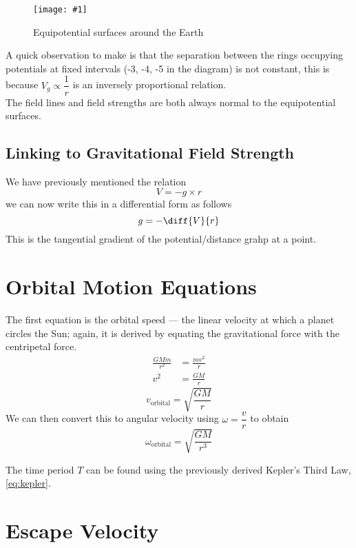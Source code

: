\documentclass[a4paper,12pt]{article}
\let\oldsection\section
\renewcommand\section{\clearpage\oldsection}
\newcommand{\lb}{\\[8pt]}
\newcommand{\img}[4]{\begin{center}
  \begin{figure}[H]
    \centering
    \texttt{[image: \#1]}
    \caption{#3}
    \label{fig:#4}
  \end{figure}
\end{center}}
\begin{document}
\img{equipotential-surfaces.png}{0.5}{Equipotential surfaces around the Earth}{equipotential}

A quick observation to make is that the separation between the rings occupying potentials at fixed intervals (-3, -4, -5 in the diagram) is not constant, this is because $V_g \propto \dfrac{1}{r}$ is an inversely proportional relation.\lb
The field lines and field strengths are both always normal to the equipotential surfaces.

\subsection{Linking to Gravitational Field Strength}

We have previously mentioned the relation $$V = -g\times r$$
we can now write this in a differential form as follows
$$g = -\diff{V}{r}$$
This is the tangential gradient of the potential/distance grahp at a point.

\section{Orbital Motion Equations}

The first equation is the orbital speed --- the linear velocity at which a planet circles the Sun; again, it is derived by equating the gravitational force with the centripetal force.
\begin{align*}
  \frac{GMm}{r^2} & = \frac{mv^2}{r} \\
  v^2             & = \frac{GM}{r}
\end{align*}
\begin{equation}\label{eq:orbital_speed}
  v_{\text{orbital}}               = \sqrt{\frac{GM}{r}}
\end{equation}
We can then convert this to angular velocity using $\omega = \dfrac{v}{r}$ to obtain
\begin{equation}\label{eq:angular_velocity}
  \omega_{\text{orbital}} = \sqrt{\frac{GM}{r^3}}
\end{equation}

The time period $T$ can be found using the previously derived Kepler's Third Law, \cref{eq:kepler}.

\section{Escape Velocity}
\end{document}
